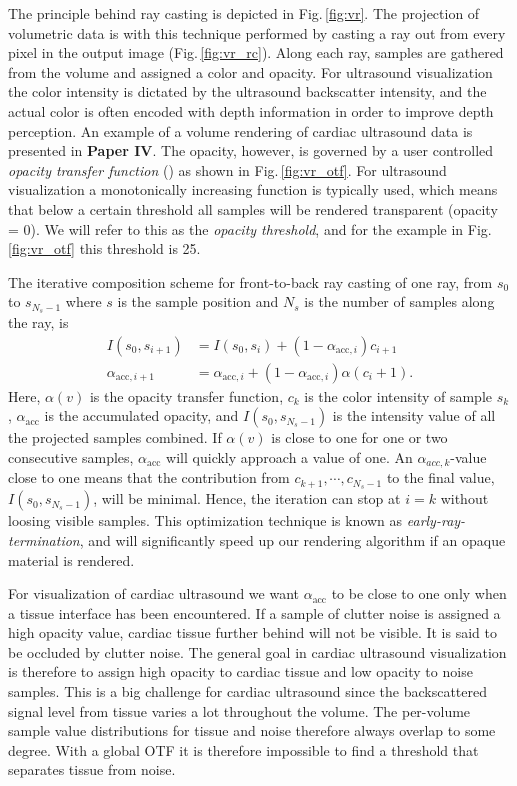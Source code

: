 The principle behind ray casting is depicted in Fig.\,\ref{fig:vr}. The projection of volumetric data is with this technique performed by casting a ray out from every pixel in the output image (Fig.\,\ref{fig:vr_rc}). Along each ray, samples are gathered from the volume and assigned a color and opacity. For ultrasound visualization the color intensity is dictated by the ultrasound backscatter intensity, and the actual color is often encoded with depth information in order to improve depth perception. An example of a volume rendering of cardiac ultrasound data is presented in \textbf{Paper IV}. The opacity, however, is governed by a user controlled \textit{opacity transfer function} () as shown in Fig.\,\ref{fig:vr_otf}. For ultrasound visualization a monotonically increasing function is typically used, which means that below a certain threshold all samples will be rendered transparent (opacity = 0). We will refer to this as the \textit{opacity threshold}, and for the example in Fig.\,\ref{fig:vr_otf} this threshold is 25.

The iterative composition scheme for front-to-back ray casting of one ray, from $s_0$ to $s_{N_s-1}$ where $s$ is the sample position and $N_s$ is the number of samples along the ray, is \cite{rtvg2006}
\begin{align}
I(s_0, s_{i+1}) &= I(s_0, s_{i}) + (1 - \alpha_{\text{acc},i}) c_{i+1}\\
\alpha_{\text{acc},i+1} &= \alpha_{\text{acc},i} + (1 - \alpha_{\text{acc},i}) \alpha(c_i+1).
\label{eq:fronToBack}
\end{align}
Here, $\alpha(v)$ is the opacity transfer function, $c_{k}$ is the color intensity of sample $s_{k}$, $\alpha_{\text{acc}}$ is the accumulated opacity, and $I(s_0, s_{N_s-1})$ is the intensity value of all the projected samples combined. If $\alpha(v)$ is close to one for one or two consecutive samples, $\alpha_{\text{acc}}$ will quickly approach a value of one. An $\alpha_{acc,k}$-value close to one means that the contribution from $c_{k+1}, \cdots, c_{N_s-1}$ to the final value, $I(s_0, s_{N_s-1})$, will be minimal. Hence, the iteration can stop at $i=k$ without loosing visible samples. This optimization technique is known as \textit{early-ray-termination}, and will significantly speed up our rendering algorithm if an opaque material is rendered.

For visualization of cardiac ultrasound we want $\alpha_{\text{acc}}$ to be close to one only when a tissue interface has been encountered. If a sample of clutter noise is assigned a high opacity value, cardiac tissue further behind will not be visible. It is said to be occluded by clutter noise. The general goal in cardiac ultrasound visualization is therefore to assign high opacity to cardiac tissue and low opacity to noise samples. This is a big challenge for cardiac ultrasound since the backscattered signal level from tissue varies a lot throughout the volume. The per-volume sample value distributions for tissue and noise therefore always overlap to some degree. With a global OTF it is therefore impossible to find a threshold that separates tissue from noise.

